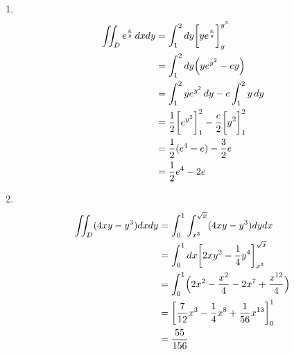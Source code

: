 \begin{ans*}
  ${}$
  \begin{enumerate}[label=(\arabic*), ref=(\arabic*), itemsep=0pt]
    \item ${}$
    \begin{align}
      \iint_D e^{\frac{x}{y}}\,dxdy
      &= \int_{1}^{2}dy \biggl[ye^\frac{x}{y}\biggr]_{y}^{y^3} \\
      &= \int_{1}^{2}dy \Bigl(ye^{y^2} - ey\Bigr) \\
      &= \int_{1}^{2}ye^{y^2} \,dy - e\int_{1}^{2}y\,dy \\
      &= \frac{1}{2}\biggl[e^{y^2}\biggr]_{1}^{2} - \frac{e}{2}\biggl[y^{2}\biggr]_{1}^{2} \\
      &= \frac{1}{2}(e^{4} - e) - \frac{3}{2}e \\
      &= \frac{1}{2}e^{4} - 2e
    \end{align}
    \item ${}$
    \begin{align}
      \iint_D (4xy - y^3)dxdy
      &= \int_{0}^{1}\int_{x^3}^{\sqrt{x}}(4xy - y^3)dydx \\
      &= \int_{0}^{1}dx \biggl[2xy^2 - \frac{1}{4}y^4\biggr]_{x^3}^{\sqrt{x}} \\
      &= \int_{0}^{1}\Bigl(2x^2 - \frac{x^2}{4} - 2x^7 + \frac{x^{12}}{4}\Bigr) \\
      &= \biggl[\frac{7}{12}x^3 - \frac{1}{4}x^8 + \frac{1}{56}x^{13}\biggr]_{0}^{1} \\
      &= \frac{55}{156}
    \end{align}
  \end{enumerate}
\end{ans*}


